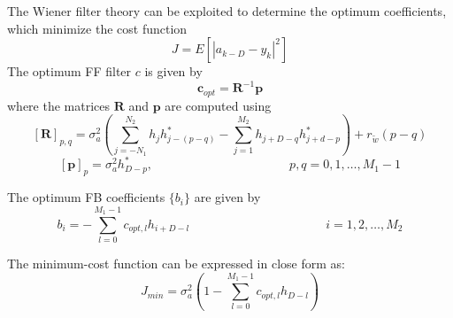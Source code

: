 \documentclass[a4paper, 12pt]{report}
\begin{document}
The Wiener filter theory can be exploited to determine the optimum coefficients, which minimize the cost function
\begin{equation}
J = E \left[|a_{k-D}-y_k|^2\right]
\end{equation}
The optimum FF filter $c$ is given by
\begin{equation}\label{c}
\mathbf{c}_{opt} = \mathbf{R}^{-1}\mathbf{p}
\end{equation}
where the matrices $\mathbf{R}$ and $\mathbf{p}$ are computed using
\begin{equation}
\mathbf{[R]}_{p,q} = \sigma_a^2 \left( \sum_{j=-N_1}^{N_2}h_jh^*_{j-(p-q)}-\sum_{j=1}^{M_2}h_{j+D-q}h^*_{j+d-p} \right) + r_{\tilde{w}}(p-q)
\end{equation}
\begin{equation}
\mathbf{[p]}_p = \sigma_a^2 h^*_{D-p}, \quad\quad\quad\quad\quad\quad\quad\quad\quad\quad\quad p,q = 0,1,\dots,M_1-1
\end{equation}

The optimum FB coefficients $\{b_i\}$ are given by
\begin{equation}
b_i = -\sum_{l=0}^{M_1-1}c_{opt,l}h_{i+D-l} \quad\quad\quad\quad\quad\quad\quad\quad\quad\quad\quad i =1,2,\dots,M_2
\end{equation}

The minimum-cost function can be expressed in close form as:
\begin{equation}\label{jmincf}
J_{min} = \sigma^2_a \left( 1-\sum_{l=0}^{M_1-1} c_{opt,l}h_{D-l}\right)
\end{equation}
\end{document}
